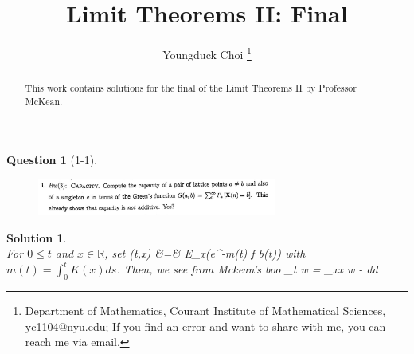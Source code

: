 \documentclass[11pt]{article}
\date{}
\title{\vspace{-0.7cm}
Limit Theorems II: Final}
\author{
Youngduck Choi 
\thanks{Department of Mathematics, Courant Institute of Mathematical Sciences, 
yc1104@nyu.edu; If you find an error and want to share with me, 
you can reach me via email.
}}
\theoremstyle{plain}
\def\eQb#1\eQe{\begin{eqnarray*}#1\end{eqnarray*}}
\theoremstyle{quest}
\newtheorem*{question}{Question}
\newtheorem*{solution}{Solution}
\begin{document}
\maketitle

\begin{abstract}
This work contains solutions for the final of the Limit Theorems II by Professor
McKean.
\end{abstract}


\begin{question}[1-1]
\hfill
\begin{figure}[h!]
  \centering
    \includegraphics[width=0.7\textwidth]{limthm2-f-p1.png}
\end{figure}
\end{question}
\begin{solution} \hfill \\
For $0 \leq t$ and $x \in \mathbb{R}$, set
\eQb
w(t,x) &=& E_x(e^{-\beta m(t) f \circ b(t)}) 
\eQe
with $m(t) = \int_{0}^{t} K(x) ds$. 
Then, we see from Mckean's boo 
\eQb
w \>\>\>  \>\>\> \partial_t w =  \partial_{xx} w - \beta 
\eQe
dd

\end{solution}

\newpage
\end{document}
